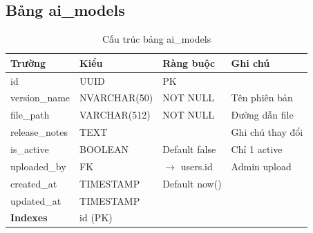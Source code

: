 \documentclass[12pt,a4paper]{article}
\begin{document}
\subsection{Bảng ai\_models}
\begin{longtable}{|l|l|l|p{5.5cm}|}
    \caption{Cấu trúc bảng ai\_models}                                                          \\
    \hline
    \rowcolor{headerblue}
    \textbf{Trường}  & \textbf{Kiểu}                & \textbf{Ràng buộc}     & \textbf{Ghi chú} \\
    \hline
    id               & UUID                         & PK                     &                  \\
    \hline
    version\_name    & NVARCHAR(50)                 & NOT NULL               & Tên phiên bản    \\
    \hline
    file\_path       & VARCHAR(512)                 & NOT NULL               & Đường dẫn file   \\
    \hline
    release\_notes   & TEXT                         &                        & Ghi chú thay đổi \\
    \hline
    is\_active       & BOOLEAN                      & Default false          & Chỉ 1 active     \\
    \hline
    uploaded\_by     & FK                           & $\rightarrow$ users.id & Admin upload     \\
    \hline
    created\_at      & TIMESTAMP                    & Default now()          &                  \\
    \hline
    updated\_at      & TIMESTAMP                    &                        &                  \\
    \hline
    \rowcolor{headerblue}
    \textbf{Indexes} & \multicolumn{3}{l|}{id (PK)}                                             \\
    \hline
\end{longtable}
\end{document}
